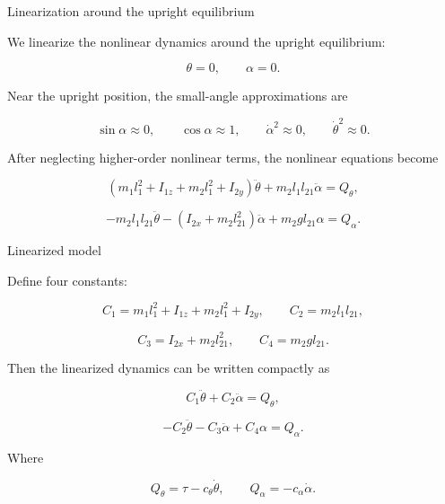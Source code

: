 \documentclass[aspectratio=169]{beamer}
\begin{document}
\begin{frame}{Linearization around the upright equilibrium}

We linearize the nonlinear dynamics around the upright equilibrium:

\[
\theta = 0, 
\qquad
\alpha = 0 .
\]

\vspace{0.2cm}

Near the upright position, the small-angle approximations are

\[
\sin\alpha \approx 0,
\qquad
\cos\alpha \approx 1,
\qquad
\dot{\alpha}^2 \approx 0,
\qquad
\dot{\theta}^2 \approx 0 .
\]

\vspace{0.2cm}

After neglecting higher-order nonlinear terms, the nonlinear equations become

\[
\left(m_1l_1^2+I_{1z}+m_2l_1^2+I_{2y}\right)\ddot{\theta}
+
m_2l_1l_{21}\ddot{\alpha}
=
Q_\theta ,
\]

\[
-m_2l_1l_{21}\ddot{\theta}
-
\left(I_{2x}+m_2l_{21}^2\right)\ddot{\alpha}
+
m_2gl_{21}\alpha
=
Q_\alpha .
\]

\end{frame}


\begin{frame}{Linearized model}

Define four constants:

\[
C_1=m_1l_1^2+I_{1z}+m_2l_1^2+I_{2y},
\qquad
C_2=m_2l_1l_{21},
\]

\[
C_3=I_{2x}+m_2l_{21}^2,
\qquad
C_4=m_2gl_{21}.
\]



Then the linearized dynamics can be written compactly as

\[
C_1\ddot{\theta}+C_2\ddot{\alpha}=Q_\theta ,
\]

\[
-C_2\ddot{\theta}-C_3\ddot{\alpha}+C_4\alpha=Q_\alpha .
\]


Where

\[
Q_\theta=\tau-c_\theta\dot{\theta},
\qquad
Q_\alpha=-c_\alpha\dot{\alpha}.
\]

\end{frame}
\end{document}
